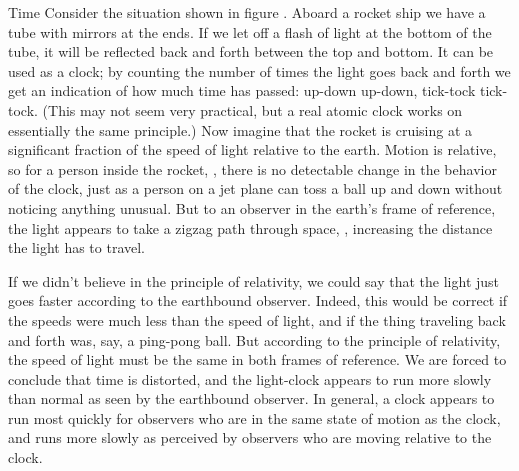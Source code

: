 \begin{envsubsection}{Time}
Consider the situation shown in figure  . Aboard
a rocket ship we have a tube with mirrors at the ends. If we
let off a flash of light at the bottom of the tube, it will
be reflected back and forth between the top and bottom. It
can be used as a clock; by counting the number of times the
light goes back and forth we get an indication of how much
time has passed: up-down up-down, tick-tock tick-tock. (This may not seem very practical, but a
real atomic clock works on essentially the same
principle.) Now imagine that the rocket is cruising at a
significant fraction of the speed of light relative to the
earth. Motion is relative, so for a person inside the
rocket,  , there is no detectable change in the behavior
of the clock, just as a person on a jet plane can toss a
ball up and down without noticing anything unusual. But to
an observer in the earth's frame of reference, the light
appears to take a zigzag path through space, , increasing
the distance the light has to travel.


If we didn't believe in the principle of relativity, we
could say that the light just goes faster according to the
earthbound observer. Indeed, this would be correct if the
speeds were much less than the speed of light, and if the
thing traveling back and forth was, say, a ping-pong ball.
But according to the principle of relativity, the speed of
light must be the same in both frames of reference. We are
forced to conclude that time is distorted, and the
light-clock appears to run more slowly than normal as seen
by the earthbound observer. In general, a clock appears to
run most quickly for observers who are in the same state of
motion as the clock, and runs more slowly as perceived by
observers who are moving relative to the clock.



\end{envsubsection}
